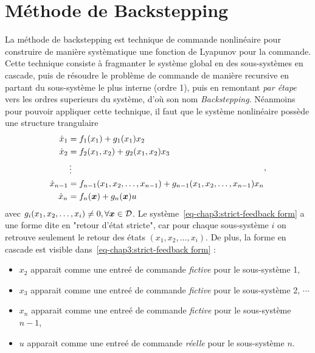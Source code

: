 \section{Méthode de Backstepping}
La méthode de backstepping est technique de commande nonlinéaire pour construire de manière systèmatique une fonction de Lyapunov pour la commande. Cette technique consiste à fragmanter le système  global en des sous-systèmes en cascade, puis de résoudre le problème de commande de manière recursive en partant du sous-système le plus interne (ordre 1), puis en remontant \emph{par étape} vers les ordres superieurs du système, d'où son nom \emph{Backstepping}. Néanmoins pour pouvoir appliquer cette technique, il faut que  le système nonlinéaire possède une structure trangulaire
\begin{align}\label{eq-chap3:strict-feedback form}
	\begin{split}
		\dot{x}_1 &= f_1(x_1) + g_1(x_1)x_2\\
		\dot{x}_2 &= f_2(x_1,x_2) + g_2(x_1,x_2)x_3\\
		&\vdots \\
		\dot{x}_{n-1} &= f_{n-1}(x_1,x_2,\ldots,x_{n-1}) +  g_{n-1}(x_1,x_2,\ldots,x_{n-1})x_n\\
		\dot{x}_n &= f_{n}(\bm{x}) +  g_{n}(\bm{x})u
	\end{split},
\end{align} 
avec $g_i(x_1,x_2,\ldots,x_i)\neq0, \forall \bm{x}\in{\cal D}$. Le système~\eqref{eq-chap3:strict-feedback form} a une forme dite en "retour d'état stricte", car pour chaque sous-système $i$ on retrouve seulement le retour des états $(x_1,x_2,\ldots,x_i)$. De plus,  la forme en cascade est visible dans~\eqref{eq-chap3:strict-feedback form} : 
\begin{itemize}
	\item $x_2$ apparait comme une entreé de commande \emph{fictive} pour le sous-système 1,
	\item $x_3$ apparait comme une entreé de commande \emph{fictive} pour le sous-système 2, $\cdots$
	\item  $x_n$ apparait comme une entreé de commande \emph{fictive} pour le sous-système $n-1$, 
	\item  $u$ apparait comme une entreé de commande \emph{réelle} pour le sous-système $n$.
\end{itemize}

